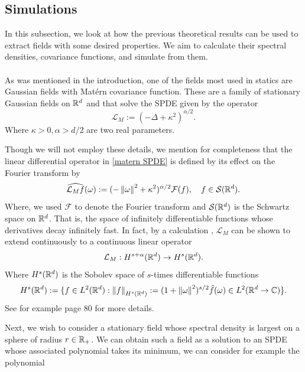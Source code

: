 \documentclass[
    a4paper,
    DIV=14,
    abstract=true,
    numbers=noenddot
]{scrartcl}
\begin{document}
\subsection{Simulations}\label{simulations section}
In this subsection, we look at how the previous theoretical results can be used to extract fields with some desired properties. We aim to calculate their spectral densities, covariance functions, and simulate from them.\\
\\
As was mentioned in the introduction, one of the fields most used in statics are Gaussian fields with Matérn covariance function. These are a family of stationary Gaussian fields on $\mathbb{R}^d$ and that solve the SPDE given by the operator
\begin{equation}\label{matern SPDE}
	\mathcal{L}_M:=(-\Delta+\kappa^2)^{\alpha/2}.
\end{equation}
Where $\kappa>0,\alpha>d/2$ are two real parameters.
\begin{observation}
	Though we will not employ these details, we mention for completeness that the linear differential operator in \eqref{matern SPDE} is defined by its effect on the Fourier transform by
	\begin{equation*}
		\widehat{\mathcal{L}_Mf}(\omega):=(-\left\lVert \omega \right\rVert^2+\kappa^2)^{\alpha/2}\mathcal{F}({f}),\quad f\in\mathcal{S}(\mathbb{R}^d).
	\end{equation*}
	Where, we used $\mathcal{F}$ to denote the Fourier transform and $\mathcal{S}(\mathbb{R}^d)$ is the Schwartz space on $\mathbb{R}^d$. That is, the space of infinitely differentiable functions whose derivatives decay infinitely fast. In fact, by a calculation , $\mathcal{L}_M$ can be shown to extend continuously to a continuous linear operator
	\begin{equation*}
		\mathcal{L}_M: H^{s+\alpha}(\mathbb{R}^d)\to H^s(\mathbb{R}^d).
	\end{equation*}
	Where $H^s(\mathbb{R}^d)$ is the Sobolev space of $s$-times differentiable functions
	\begin{equation*}
		H^s(\mathbb{R}^d):=\lbrace f\in L^2(\mathbb{R}^d):\left\lVert f \right\rVert_{ H^s(\mathbb{R}^d)}:= (1+\left\lVert \omega \right\rVert^2)^{s/2}\hat{f}(\omega)\in L^2(\mathbb{R}^d\to\mathbb{C})\rbrace.
	\end{equation*}
	See for example \cite{lototsky2017stochastic} page $80$ for more details.
\end{observation}
Next, we wish to consider a stationary field whose spectral density is largest on a sphere of radius $r\in \mathbb{R}_+$. We can obtain such a field as a solution to an SPDE whose associated polynomial takes its minimum, we can consider for example the polynomial
\end{document}
